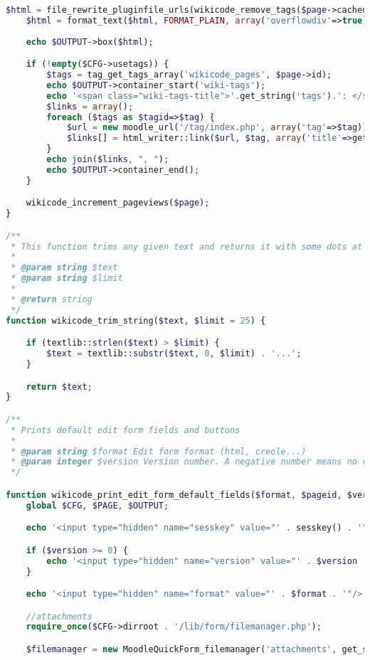 \begin{lstlisting}[language=PHP]
    $html = file_rewrite_pluginfile_urls(wikicode_remove_tags($page->cachedcontent), 'pluginfile.php', $context->id, 'mod_wikicode', 'attachments', $subwikiid);
    $html = format_text($html, FORMAT_PLAIN, array('overflowdiv'=>true));
	
    echo $OUTPUT->box($html);

    if (!empty($CFG->usetags)) {
        $tags = tag_get_tags_array('wikicode_pages', $page->id);
        echo $OUTPUT->container_start('wiki-tags');
        echo '<span class="wiki-tags-title">'.get_string('tags').': </span>';
        $links = array();
        foreach ($tags as $tagid=>$tag) {
            $url = new moodle_url('/tag/index.php', array('tag'=>$tag));
            $links[] = html_writer::link($url, $tag, array('title'=>get_string('tagtitle', 'wiki', $tag)));
        }
        echo join($links, ", ");
        echo $OUTPUT->container_end();
    }

    wikicode_increment_pageviews($page);
}

/**
 * This function trims any given text and returns it with some dots at the end
 *
 * @param string $text
 * @param string $limit
 *
 * @return string
 */
function wikicode_trim_string($text, $limit = 25) {

    if (textlib::strlen($text) > $limit) {
        $text = textlib::substr($text, 0, $limit) . '...';
    }

    return $text;
}

/**
 * Prints default edit form fields and buttons
 *
 * @param string $format Edit form format (html, creole...)
 * @param integer $version Version number. A negative number means no versioning.
 */

function wikicode_print_edit_form_default_fields($format, $pageid, $version = -1, $upload = false, $deleteuploads = array()) {
    global $CFG, $PAGE, $OUTPUT;

    echo '<input type="hidden" name="sesskey" value="' . sesskey() . '" />';

    if ($version >= 0) {
        echo '<input type="hidden" name="version" value="' . $version . '" />';
    }

    echo '<input type="hidden" name="format" value="' . $format . '"/>';

    //attachments
    require_once($CFG->dirroot . '/lib/form/filemanager.php');

    $filemanager = new MoodleQuickForm_filemanager('attachments', get_string('wikiattachments', 'wikicode'), array('id' => 'attachments'), array('subdirs' => false, 'maxfiles' => 99, 'maxbytes' => $CFG->maxbytes));


\end{lstlisting}
